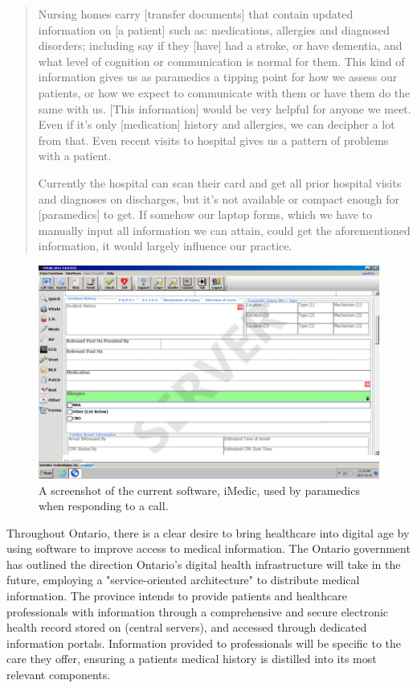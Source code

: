 \blockquote{Nursing homes carry [transfer documents] that contain updated information on [a patient] such as: medications, allergies and diagnosed disorders; including say if they [have] had a stroke, or have dementia, and what level of cognition or communication is normal for them. This kind of information gives us as paramedics a tipping point for how we assess our patients, or how we expect to communicate with them or have them do the same with us. [This information] would be very helpful for anyone we meet. Even if it's only [medication] history and allergies, we can decipher a lot from that. Even recent visits to hospital gives us a pattern of problems with a patient.

Currently the hospital can scan their card and get all prior hospital visits and diagnoses on discharges, but it's not available or compact enough for [paramedics] to get. If somehow our laptop forms, which we have to manually input all information we can attain, could get the aforementioned information, it would largely influence our practice.
}



\begin{figure}[h]
  \centering
  \includegraphics[width=\linewidth]{iMedic.png}
  \captionsetup{format=hang}
  \caption[Screenshot of iMedic Software]{A screenshot of the current software, iMedic, used by paramedics when responding to a call.}
  \label{fig:iMed1}
\end{figure}


\iffalse

Throughout Ontario, there is a clear desire to bring healthcare into digital age by using software to improve access to medical information. The Ontario government has outlined the direction Ontario's digital health infrastructure will take in the future, employing a "service-oriented architecture" to distribute medical information.  The province intends to provide patients and healthcare professionals with information through a comprehensive and secure electronic health record stored on (central servers), and accessed through dedicated information portals. Information provided to professionals will be specific to the care they offer, ensuring a patients medical history is distilled into its most relevant components.



